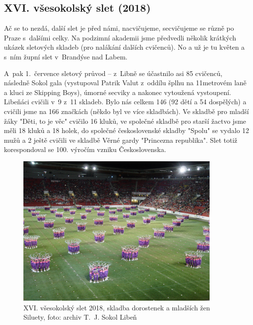 \documentclass[a5paper, 11pt, twoside]{article}
\begin{document}
\subsection{XVI. všesokolský slet (2018)}

Ač se to nezdá, další slet je před námi, nacvičujeme, secvičujeme se
různě po Praze s~dalšími celky. Na podzimní akademii jsme předvedli
několik krátkých ukázek sletových skladeb (pro nalákání dalších
cvičenců). No a už je tu květen a s~ním župní slet v~Brandýse nad Labem.

A~pak 1.~července sletový průvod -- z~Libně se účastnilo asi 85
cvičenců, následně Sokol gala (vystupoval Patrik Valut z~oddílu šplhu na
11metrovém laně a kluci ze Skipping Boys), úmorné secviky a nakonec
vytoužená vystoupení. Libeňáci cvičili v~9 z~11 skladeb. Bylo nás celkem
146 (92 dětí a 54 dospělých) a cvičili jsme na 166 značkách (někdo byl
ve více skladbách). Ve skladbě pro mladší žáky "Děti, to je věc"
cvičilo 16 kluků, ve společné skladbě pro starší žactvo jsme měli 18
kluků a 18 holek, do společné československé skladby "Spolu" se vydalo
12 mužů a 2 ještě cvičili ve skladbě Věrné gardy "Princezna
republika". Slet totiž korespondoval se 100. výročím vzniku
Československa.

\begin{figure}[hp]
  \centering 
  \includegraphics[width=0.9\textwidth]{img/64_siluety.JPG}
  \caption*{XVI. všesokolský slet 2018, skladba dorostenek a mladších žen
  Siluety, foto: archiv T.~J. Sokol Libeň}
\end{figure}
\end{document}
